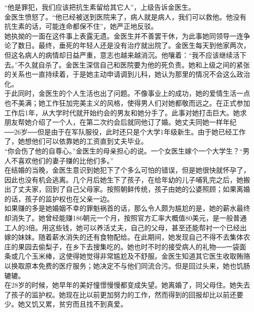 “他是罪犯，我们应该把抗生素留给其它人”，上级告诉金医生。\\

金医生愤怒了。“他已经被送到医院来了，病人就是病人，我们可以救他。他没有抗生素的话，可能连命都保不住”，她严正地反驳。\\

她执拗的一面在这件事上表露无遗。金医生并不善罢干休，为此事她同领导一连争论了数日。最终，垂死的年轻人还是没有治疗就出院了。金医生每天到他家两次，但这名病人的病情却日益严重，意志也越来越消沉。他嚷着：“我不应该继续活下去。”不久就自杀了。金医生深信自己和医院要为他的死负责。她和上级之间的紧张的关系也一直持续着，于是她主动申请调到儿科，她认为那里的情况不会这么政治化。\\

于此同时，金医生的个人生活也出了问题。不像事业上的成功，她的爱情生活一点也不美满；她工作狂加完美主义的风格，使得男人们对她都敬而远之。在正式参加工作后1年，从大学时代就开始约会的男友和她分手了。此事对她打击巨大。她求朋友帮她介绍了一个人，在第二次约会后就同他订了婚。她丈夫同她一样年纪──26岁──但是由于在军队服役，此时还只是个大学1年级新生。由于她已经工作了，她想他们可以依靠她的工资直到丈夫毕业。\\

“你会伤了他的自尊心。”金医生的母亲担心的说。一个女医生嫁个一个大学生？“男人不喜欢他们的妻子赚的比他们多。”\\

在结婚的当晚，金医生意识到她犯下了个多么可怕的错误，但是她很快就怀孕了，因此也没有机会逃离。几个月后她生下了孩子，在给年幼的儿子哺乳完之后，她搬出了丈夫家，回到了自己父母家。按照朝鲜传统，孩子由她的公婆照顾；如果离婚的话，孩子的监护权也在父亲一边。\\

如果赚的多是她婚姻不幸的罪魁祸首的话，那么令人颇为尴尬的是，她的薪水最终却消失了。她曾经能赚186朝元一个月，按照官方汇率大概值80美元，是一般普通工人的3倍。用这些钱，她可以养活丈夫，自己的父母，甚至还能帮衬一个已经出嫁的妹妹。随着薪水消失的还有食物配给。在此期间，她发现自己不得不去集体农庄的果园去偷梨子，在乡下去搜集吃的。她也时不时的接受病人的礼物──一袋面条或几个玉米棒，这使得她觉得非常尴尬及不舒服。金医生知道其它医生收取贿赂以换取原本免费的医疗服务；她决定不与他们同流合污。但是回过头来，她也饥肠辘辘。\\

在28岁的时候，她早年的美好憧憬慢慢都变成失望。她离婚了，同父母住。她失去了孩子的监护权。她现在比以前更加努力的工作，然而得到的回报却比以前还要少。她又饥又累，贫穷而且找不到真爱。\\

